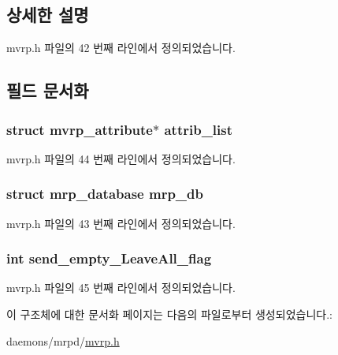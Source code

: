\subsection{상세한 설명}


mvrp.\+h 파일의 42 번째 라인에서 정의되었습니다.



\subsection{필드 문서화}
\subsubsection[{\texorpdfstring{attrib\+\_\+list}{attrib_list}}]{\setlength{\rightskip}{0pt plus 5cm}struct {\bf mvrp\+\_\+attribute}$\ast$ attrib\+\_\+list}\hypertarget{structmvrp__database_a463dff8bce0eaaee9897b5190ffc9460}{}\label{structmvrp__database_a463dff8bce0eaaee9897b5190ffc9460}


mvrp.\+h 파일의 44 번째 라인에서 정의되었습니다.

\subsubsection[{\texorpdfstring{mrp\+\_\+db}{mrp_db}}]{\setlength{\rightskip}{0pt plus 5cm}struct {\bf mrp\+\_\+database} mrp\+\_\+db}\hypertarget{structmvrp__database_a7e08db3b85c932325ce3a3605a09ab0c}{}\label{structmvrp__database_a7e08db3b85c932325ce3a3605a09ab0c}


mvrp.\+h 파일의 43 번째 라인에서 정의되었습니다.

\subsubsection[{\texorpdfstring{send\+\_\+empty\+\_\+\+Leave\+All\+\_\+flag}{send_empty_LeaveAll_flag}}]{\setlength{\rightskip}{0pt plus 5cm}int send\+\_\+empty\+\_\+\+Leave\+All\+\_\+flag}\hypertarget{structmvrp__database_a5c551b6ff3976e96ec18e69b0706a532}{}\label{structmvrp__database_a5c551b6ff3976e96ec18e69b0706a532}


mvrp.\+h 파일의 45 번째 라인에서 정의되었습니다.



이 구조체에 대한 문서화 페이지는 다음의 파일로부터 생성되었습니다.\+:\begin{DoxyCompactItemize}
\item 
daemons/mrpd/\hyperlink{mvrp_8h}{mvrp.\+h}\end{DoxyCompactItemize}
